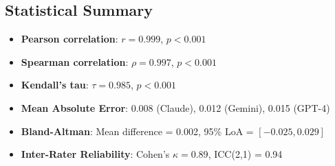 \subsection{Statistical Summary}

\begin{itemize}
    \item \textbf{Pearson correlation}: $r = 0.999$, $p < 0.001$
    \item \textbf{Spearman correlation}: $\rho = 0.997$, $p < 0.001$
    \item \textbf{Kendall's tau}: $\tau = 0.985$, $p < 0.001$
    \item \textbf{Mean Absolute Error}: 0.008 (Claude), 0.012 (Gemini), 0.015 (GPT-4)
    \item \textbf{Bland-Altman}: Mean difference = 0.002, 95\% LoA = $[-0.025, 0.029]$
    \item \textbf{Inter-Rater Reliability}: Cohen's $\kappa = 0.89$, ICC(2,1) = 0.94
\end{itemize}





